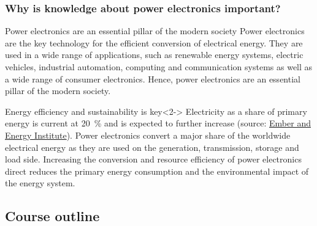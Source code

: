 \begin{frame}
	\frametitle{Why is knowledge about power electronics important?}
	\begin{varblock}{Power electronics are an essential pillar of the modern society}
		Power electronics are the key technology for the efficient conversion of electrical energy. They are used in a wide range of applications, such as renewable energy systems, electric vehicles, industrial automation, computing and communication systems as well as a wide range of consumer electronics. Hence, power electronics are an essential pillar of the modern society.  
	\end{varblock}
	\begin{varblock}{Energy efficiency and sustainability is key}<2->
		Electricity as a share of primary energy is current at \SI{20}{\percent} and is expected to further increase (source: \href{https://ourworldindata.org/grapher/electricity-as-a-share-of-primary-energy}{Ember and Energy Institute}). Power electronics convert a major share of the worldwide electrical energy as they are used on the generation, transmission, storage and load side. Increasing the conversion and resource efficiency of power electronics direct reduces the primary energy consumption and the environmental impact of the energy system. 
	\end{varblock}
\end{frame}


\subsection{Course outline}

